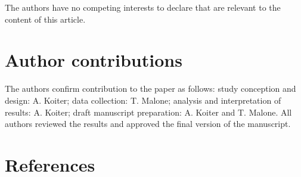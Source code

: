 \documentclass[
]{agujournal2019}
\begin{document}
The authors have no competing interests to declare that are relevant to
the content of this article.

\section*{Author contributions}\label{author-contributions}

The authors confirm contribution to the paper as follows: study
conception and design: A. Koiter; data collection: T. Malone; analysis
and interpretation of results: A. Koiter; draft manuscript preparation:
A. Koiter and T. Malone. All authors reviewed the results and approved
the final version of the manuscript.

\section*{References}\label{references}
\end{document}
